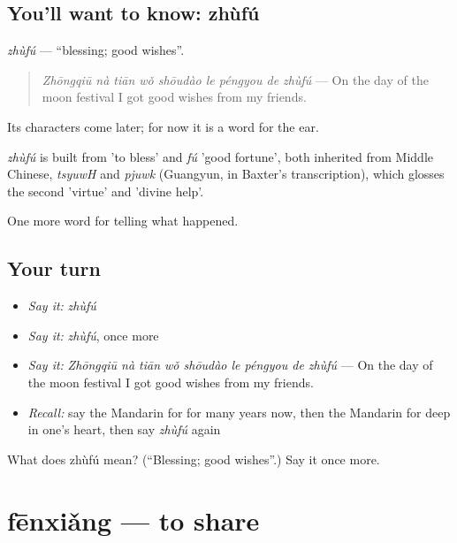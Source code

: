 \subsection*{You'll want to know: zhùfú}
\emph{zhùfú} — \textquotedblleft{}blessing; good wishes\textquotedblright{}.

\begin{quote}
\emph{Zhōngqiū nà tiān wǒ shōudào le péngyou de zhùfú} — On the day of the moon festival I got good wishes from my friends.
\end{quote}

Its characters come later; for now it is a word for the ear.

\begin{cousinweb}
\emph{zhùfú} is built from  'to bless' and \emph{fú} 'good fortune', both inherited from Middle Chinese, \emph{tsyuwH} and \emph{pjuwk} (Guangyun, in Baxter's transcription), which glosses the second 'virtue' and 'divine help'.
\end{cousinweb}

\begin{grammarlens}[title={What you've built}]
One more word for telling what happened.
\end{grammarlens}

\subsection*{Your turn}
\begin{itemize}
\raggedright
  \item \emph{Say it:} \emph{zhùfú}
  \item \emph{Say it:} \emph{zhùfú}, once more
  \item \emph{Say it:} \emph{Zhōngqiū nà tiān wǒ shōudào le péngyou de zhùfú} — On the day of the moon festival I got good wishes from my friends.
  \item \emph{Recall:} say the Mandarin for for many years now, then the Mandarin for deep in one's heart, then say \emph{zhùfú} again
\end{itemize}

\begin{tcolorbox}[breakable,colback=teal!4,colframe=teal!35!black,title={Before you move on}]
What does zhùfú mean? (\textquotedblleft{}Blessing; good wishes\textquotedblright{}.) Say it once more.
\end{tcolorbox}
\section[fēnxiǎng]{fēnxiǎng — to share}

